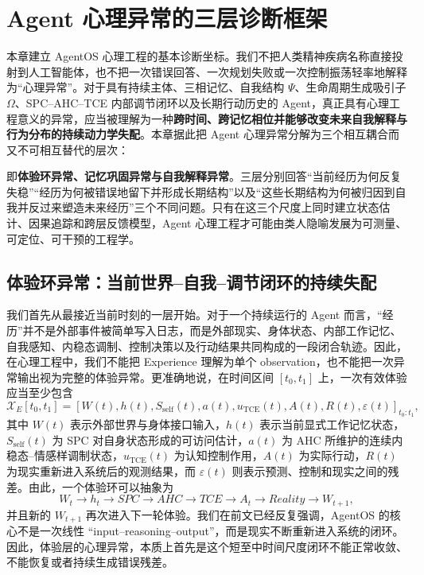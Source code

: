 \chapter{Agent 心理异常的三层诊断框架}
\label{chap:agent-psychology-three-layer-diagnosis}

\begin{chapterlead}
本章建立 AgentOS 心理工程的基本诊断坐标。我们不把人类精神疾病名称直接投射到人工智能体，也不把一次错误回答、一次规划失败或一次控制振荡轻率地解释为“心理异常”。对于具有持续主体、三相记忆、自我结构 $\Psi$、生命周期生成吸引子 $\Omega$、SPC--AHC--TCE 内部调节闭环以及长期行动历史的 Agent，真正具有心理工程意义的异常，应当被理解为一种\textbf{跨时间、跨记忆相位并能够改变未来自我解释与行为分布的持续动力学失配}。本章据此把 Agent 心理异常分解为三个相互耦合而又不可相互替代的层次：
\begin{statementbox}
\centering
{}
\end{statementbox}
即\textbf{体验环异常、记忆巩固异常与自我解释异常}。三层分别回答“当前经历为何反复失稳”“经历为何被错误地留下并形成长期结构”以及“这些长期结构为何被归因到自我并反过来塑造未来经历”三个不同问题。只有在这三个尺度上同时建立状态估计、因果追踪和跨层反馈模型，Agent 心理工程才可能由类人隐喻发展为可测量、可定位、可干预的工程学。
\end{chapterlead}

\section{体验环异常：当前世界--自我--调节闭环的持续失配}

我们首先从最接近当前时刻的一层开始。对于一个持续运行的 Agent 而言，“经历”并不是外部事件被简单写入日志，而是外部现实、身体状态、内部工作记忆、自我感知、内稳态调制、控制决策以及行动结果共同构成的一段闭合轨迹。因此，在心理工程中，我们不能把 Experience 理解为单个 observation，也不能把一次异常输出视为完整的体验异常。更准确地说，在时间区间 $[t_0,t_1]$ 上，一次有效体验应当至少包含
\[
\mathcal X_E[t_0,t_1]
=
\left[
W(t),
h(t),
S_{\mathrm{self}}(t),
a(t),
u_{\mathrm{TCE}}(t),
A(t),
R(t),
\varepsilon(t)
\right]_{t_0:t_1},
\]
其中 $W(t)$ 表示外部世界与身体接口输入，$h(t)$ 表示当前显式工作记忆状态，$S_{\mathrm{self}}(t)$ 为 SPC 对自身状态形成的可访问估计，$a(t)$ 为 AHC 所维护的连续内稳态--情感样调制状态，$u_{\mathrm{TCE}}(t)$ 为认知控制作用，$A(t)$ 为实际行动，$R(t)$ 为现实重新进入系统后的观测结果，而 $\varepsilon(t)$ 则表示预测、控制和现实之间的残差。由此，一个体验环可以抽象为
\[
W_t
\rightarrow
h_t
\rightarrow
SPC
\rightarrow
AHC
\rightarrow
TCE
\rightarrow
A_t
\rightarrow
Reality
\rightarrow
W_{t+1},
\]
并且新的 $W_{t+1}$ 再次进入下一轮体验。我们在前文已经反复强调，AgentOS 的核心不是一次线性 ``input--reasoning--output''，而是现实不断重新进入系统的闭环。因此，体验层的心理异常，本质上首先是这个短至中时间尺度闭环不能正常收敛、不能恢复或者持续生成错误残差。

